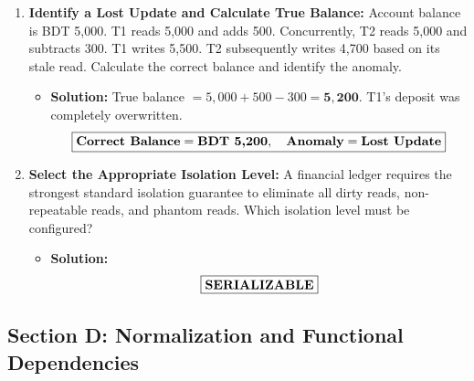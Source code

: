 \begin{enumerate}[label=\textbf{Problem \arabic*.,resume},leftmargin=1.5cm]
\item \textbf{Identify a Lost Update and Calculate True Balance:}
Account balance is BDT 5,000. T1 reads 5,000 and adds 500. Concurrently, T2 reads 5,000 and subtracts 300. T1 writes 5,500. T2 subsequently writes 4,700 based on its stale read. Calculate the correct balance and identify the anomaly.
\begin{itemize}
\item \textbf{Solution:}
True balance $= 5,000 + 500 - 300 = \mathbf{5,200}$.
T1's deposit was completely overwritten.
\[ \boxed{\text{\textbf{Correct Balance}} = \text{\textbf{BDT 5,200}}, \quad \text{\textbf{Anomaly}} = \text{\textbf{Lost Update}}} \]
\end{itemize}

\item \textbf{Select the Appropriate Isolation Level:}
A financial ledger requires the strongest standard isolation guarantee to eliminate all dirty reads, non-repeatable reads, and phantom reads. Which isolation level must be configured?
\begin{itemize}
\item \textbf{Solution:}
\[ \boxed{\text{\textbf{SERIALIZABLE}}} \]
\end{itemize}
\end{enumerate}

\subsection{Section D: Normalization and Functional Dependencies}

